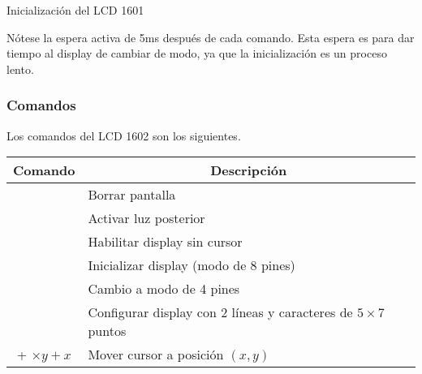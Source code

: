 \begin{algorithm}[H]
	\centering
	\caption{Inicialización del LCD 1601}%
	\label{tbl:lcd-init}
	\begin{algorithmic}
			\State {}
			\State {}

			\State {}
			\State {}

			\State {}
			\State {}

			\State {}
			\State {}

			\State {}
			\State {}
		\EndProcedure{}
	\end{algorithmic}
\end{algorithm}
\medskip

Nótese la espera activa de 5ms después de cada comando. Esta espera es para dar tiempo al display de cambiar de modo, ya que la inicialización es un proceso lento.

\subsubsection{Comandos}
Los comandos del LCD 1602 son los siguientes.

\begin{tabularx}{0.9\linewidth}{c X}
	\toprule
	\multicolumn{1}{c}{\bfseries Comando} &
	\multicolumn{1}{c}{\bfseries Descripción} \\
	\midrule
	\hex{01} & Borrar pantalla \\
	\hex{08} & Activar luz posterior \\
	\hex{0C} & Habilitar display sin cursor \\
	\hex{33} & Inicializar display (modo de 8 pines) \\
	\hex{32} & Cambio a modo de 4 pines \\
	\hex{28} & Configurar display con 2 líneas y caracteres de $5\times7$ puntos \\
	\hex{80} + \hex{40}$\times y + x$
	         & Mover cursor a posición $(x, y)$\\
	\bottomrule
\end{tabularx}
